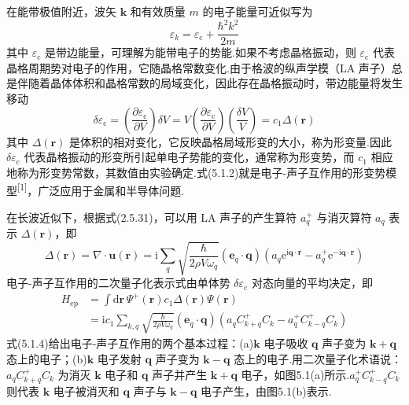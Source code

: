 在能带极值附近，波矢 $\boldsymbol{k}$ 和有效质量 $m$ 的电子能量可近似写为
\begin{equation}
  \varepsilon_k=\varepsilon_{\mathrm{c}}+\frac{\hbar^2k^2}{2m}
\end{equation}
其中 $\varepsilon_{\mathrm{c}}$ 是带边能量，可理解为能带电子的势能.如果不考虑晶格振动，则 $\varepsilon_{\mathrm{c}}$ 代表晶格周期势对电子的作用，它随晶格常数变化.由于格波的纵声学模（LA 声子）总是伴随着晶体体积和晶格常数的局域变化，因此存在晶格振动时，带边能量将发生移动
\begin{equation}
  \delta\varepsilon_{\mathrm{c}}=\left(\frac{\partial\varepsilon_{\mathrm{c}}}{\partial V}\right)\delta V
  =V\left(\frac{\partial\varepsilon_{\mathrm{c}}}{\partial V}\right)\left(\frac{\delta V}{V}\right)
  =c_1\Delta\left(\boldsymbol{r}\right)
\end{equation}
其中 $\Delta\left(\boldsymbol{r}\right)$ 是体积的相对变化，它反映晶格局域形变的大小，称为形变量.因此 $\delta\varepsilon_{\mathrm{c}}$ 代表晶格振动的形变所引起单电子势能的变化，通常称为形变势，而 $c_1$ 相应地称为形变势常数，其数值由实验确定.式(5.1.2)就是电子-声子互作用的形变势模型\textsuperscript{[1]}，广泛应用于金属和半导体问题.

在长波近似下，根据式(2.5.31)，可以用 LA 声子的产生算符 $a_q^{+}$ 与消灭算符 $a_q$ 表示 $\Delta\left(\boldsymbol{r}\right)$，即
\begin{equation}
  \Delta\left(\boldsymbol{r}\right)=\nabla\cdot\boldsymbol{u}\left(\boldsymbol{r}\right)
  =\mathrm{i}\sum_{q}\sqrt{\frac{\hbar}{2\rho V\omega_q}}
  \left(\boldsymbol{e}_q\cdot\boldsymbol{q}\right)
  \left(a_q\mathrm{e}^{\mathrm{i}\boldsymbol{q}\cdot\boldsymbol{r}}
  -a_q^{+}\mathrm{e}^{-\mathrm{i}\boldsymbol{q}\cdot\boldsymbol{r}}\right)
\end{equation}
电子-声子互作用的二次量子化表示式由单体势 $\delta\varepsilon_{\mathrm{c}}$ 对态向量的平均决定，即
\begin{equation}
\begin{aligned}
  H_{\mathrm{ep}}&=\int\mathrm{d}\boldsymbol{r}\,\varPsi^{+}\left(\boldsymbol{r}\right)
  c_1\Delta\left(\boldsymbol{r}\right)\varPsi\left(\boldsymbol{r}\right)\\
  &=\mathrm{i}c_1\sum_{k,q}\sqrt{\frac{\hbar}{2\rho V\omega_q}}
  \left(\boldsymbol{e}_q\cdot\boldsymbol{q}\right)
  \left(a_qC_{k+q}^{+}C_k-a_q^{+}C_{k-q}^{+}C_k\right)
\end{aligned}
\end{equation}
式(5.1.4)给出电子-声子互作用的两个基本过程：(a)$\boldsymbol{k}$ 电子吸收 $\boldsymbol{q}$ 声子变为 $\boldsymbol{k}+\boldsymbol{q}$ 态上的电子；(b)$\boldsymbol{k}$ 电子发射 $\boldsymbol{q}$ 声子变为 $\boldsymbol{k}-\boldsymbol{q}$ 态上的电子.用二次量子化术语说：$a_qC_{k+q}^{+}C_k$ 为消灭 $\boldsymbol{k}$ 电子和 $\boldsymbol{q}$ 声子并产生 $\boldsymbol{k}+\boldsymbol{q}$ 电子，如图5.1(a)所示.$a_q^{+}C_{k-q}^{+}C_k$ 则代表 $\boldsymbol{k}$ 电子被消灭和 $\boldsymbol{q}$ 声子与 $\boldsymbol{k}-\boldsymbol{q}$ 电子产生，由图5.1(b)表示.

